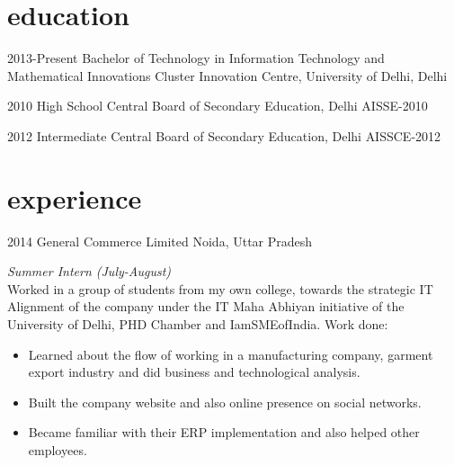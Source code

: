 \documentclass[]{devkhan-cv} %
\begin{document}

\section{education}

\begin{entrylist}


\entry
{2013-Present}
{Bachelor of Technology {\normalfont in Information Technology and Mathematical Innovations}}
{Cluster Innovation Centre, University of Delhi, Delhi}


\entry
{2010}
{High School}
{Central Board of Secondary Education, Delhi}
{AISSE-2010}


\entry
{2012}
{Intermediate}
{Central Board of Secondary Education, Delhi}
{AISSCE-2012}


\end{entrylist}


\section{experience}

\begin{entrylist}

\entry
{2014}
{General Commerce Limited}
{Noida, Uttar Pradesh}
{\emph{Summer Intern (July-August)} \\
Worked in a group of students from my own college, towards the strategic IT Alignment of the company under the IT Maha Abhiyan initiative of the University of Delhi, PHD Chamber and IamSMEofIndia. Work done: \\
\begin{itemize}
\item Learned about the flow of working in a manufacturing company, garment export industry and did business and technological analysis.
\item Built the company website and also online presence on social networks.
\item Became familiar with their ERP implementation and also helped other employees.
\end{itemize}
}


\end{entrylist}
\end{document}
